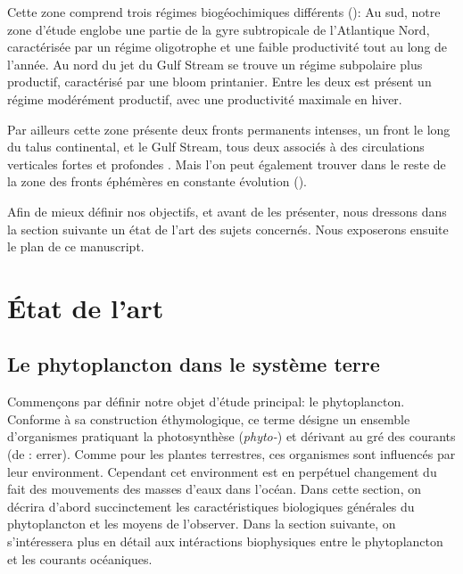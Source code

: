 Cette zone comprend trois régimes biogéochimiques différents (\cite{bock_2022}):
Au sud, notre zone d'étude englobe une partie de la gyre subtropicale de l'Atlantique Nord, caractérisée par un régime oligotrophe et une faible productivité tout au long de l'année.
Au nord du jet du Gulf Stream se trouve un régime subpolaire plus productif, caractérisé par une bloom printanier.
Entre les deux est présent un régime modérément productif, avec une productivité maximale en hiver.

Par ailleurs cette zone présente deux fronts permanents intenses, un front le long du talus continental, et le Gulf Stream, tous deux associés à des circulations verticales fortes et profondes \cite{flagg_2006,liao_2022}.
Mais l'on peut également trouver dans le reste de la zone des fronts éphémères en constante évolution (\cite{drushka_2019,sanchez-rios_2020}).

Afin de mieux définir nos objectifs, et avant de les présenter, nous dressons dans la section suivante un état de l'art des sujets concernés.
Nous exposerons ensuite le plan de ce manuscript.

\section{État de l'art}
\label{sec:etat-de-lart}

\subsection{Le phytoplancton dans le système terre}
\label{sec:phyto-ds-sys-terre}


Commençons par définir notre objet d'étude principal: le phytoplancton.
Conforme à sa construction éthymologique, ce terme désigne un ensemble d'organismes pratiquant la photosynthèse (\emph{phyto-}) et dérivant au gré des courants (de : errer).
Comme pour les plantes terrestres, ces organismes sont influencés par leur environment.
Cependant cet environment est en perpétuel changement du fait des mouvements des masses d'eaux dans l'océan.
Dans cette section, on décrira d'abord succinctement les caractéristiques biologiques générales du phytoplancton et les moyens de l'observer.
Dans la section suivante, on s'intéressera plus en détail aux intéractions biophysiques entre le phytoplancton et les courants océaniques.

